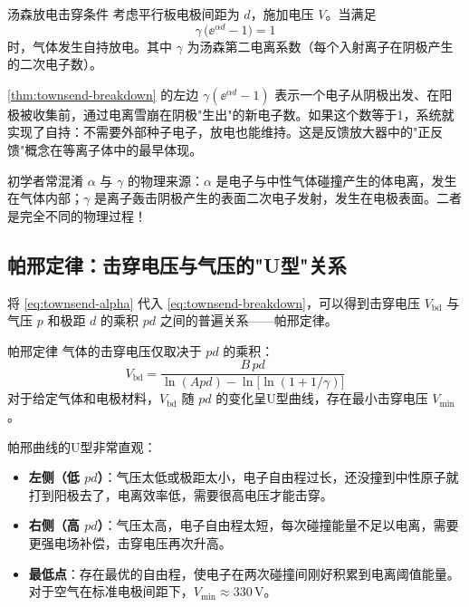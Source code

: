 \begin{theorem}{汤森放电击穿条件}{}{}
\label{thm:townsend-breakdown}
考虑平行板电极间距为 $d$，施加电压 $V$。当满足
\begin{equation}
\label{eq:townsend-breakdown}
\gamma \,\bigl(\ee^{\alpha d} - 1\bigr) = 1
\end{equation}
时，气体发生自持放电。其中 $\gamma$ 为汤森第二电离系数（每个入射离子在阴极产生的二次电子数）。
\end{theorem}

\begin{insight}{}{}
\cref{thm:townsend-breakdown} 的左边 $\gamma(\ee^{\alpha d}-1)$ 表示一个电子从阴极出发、在阳极被收集前，通过电离雪崩在阴极"生出"的新电子数。如果这个数等于1，系统就实现了自持：不需要外部种子电子，放电也能维持。这是反馈放大器中的"正反馈"概念在等离子体中的最早体现。
\end{insight}

\begin{warning}{}{}
初学者常混淆 $\alpha$ 与 $\gamma$ 的物理来源：$\alpha$ 是电子与中性气体碰撞产生的体电离，发生在气体内部；$\gamma$ 是离子轰击阴极产生的表面二次电子发射，发生在电极表面。二者是完全不同的物理过程！
\end{warning}

\subsection{帕邢定律：击穿电压与气压的"U型"关系}

将 \cref{eq:townsend-alpha} 代入 \cref{eq:townsend-breakdown}，可以得到击穿电压 $V_{\text{bd}}$ 与气压 $p$ 和极距 $d$ 的乘积 $pd$ 之间的普遍关系——帕邢定律。

\begin{theorem}{帕邢定律}{}{}
\label{thm:paschen-law}
气体的击穿电压仅取决于 $pd$ 的乘积：
\begin{equation}
\label{eq:paschen-law}
V_{\text{bd}} = \frac{B\,pd}{\ln(Apd) - \ln\!\bigl[\ln(1+1/\gamma)\bigr]}
\end{equation}
对于给定气体和电极材料，$V_{\text{bd}}$ 随 $pd$ 的变化呈U型曲线，存在最小击穿电压 $V_{\text{min}}$。
\end{theorem}

\begin{insight}{}{}
帕邢曲线的U型非常直观：
\begin{itemize}
\item \textbf{左侧（低 $pd$）}：气压太低或极距太小，电子自由程过长，还没撞到中性原子就打到阳极去了，电离效率低，需要很高电压才能击穿。
\item \textbf{右侧（高 $pd$）}：气压太高，电子自由程太短，每次碰撞能量不足以电离，需要更强电场补偿，击穿电压再次升高。
\item \textbf{最低点}：存在最优的自由程，使电子在两次碰撞间刚好积累到电离阈值能量。对于空气在标准电极间距下，$V_{\text{min}} \approx 330\,\mathrm{V}$。
\end{itemize}
\end{insight}

